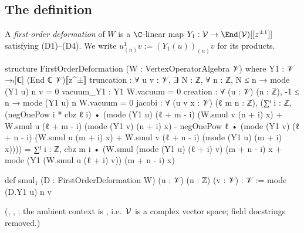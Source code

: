 \subsection{The definition}

\begin{definition}\label{l07:def:fod}
A \emph{first-order deformation} of $W$ is a $\C$-linear map
$Y_1 : \lsevenV\to\End(\lsevenV)[[z^{\pm1}]]$ satisfying (D1)--(D4). We write
$u^1_{(n)}v := (Y_1(u))_{(n)}v$ for its products.
\end{definition}

\begin{leancode}
structure FirstOrderDeformation (W : VertexOperatorAlgebra 𝒱) where
  Y1 : 𝒱 →ₗ[ℂ] (End ℂ 𝒱)⟦z^±⟧
  truncation : ∀ u v : 𝒱, ∃ N : ℤ, ∀ n : ℤ, N ≤ n → mode (Y1 u) n v = 0
  vacuum_Y1 : Y1 W.vacuum = 0
  creation : ∀ (u : 𝒱) (n : ℤ), -1 ≤ n → mode (Y1 u) n W.vacuum = 0
  jacobi : ∀ (u v x : 𝒱) (ℓ m n : ℤ),
      (∑ᶠ i : ℤ, (negOnePow i * cbz ℓ i) •
          (mode (Y1 u) (ℓ + m - i) (W.smul v (n + i) x)
            + W.smul u (ℓ + m - i) (mode (Y1 v) (n + i) x)
            - negOnePow ℓ •
              (mode (Y1 v) (ℓ + n - i) (W.smul u (m + i) x)
                + W.smul v (ℓ + n - i) (mode (Y1 u) (m + i) x))))
        = ∑ᶠ i : ℤ, cbz m i •
            (W.smul (mode (Y1 u) (ℓ + i) v) (m + n - i) x
              + mode (Y1 (W.smul u (ℓ + i) v)) (m + n - i) x)

def smul₁ (D : FirstOrderDeformation W) (u : 𝒱) (n : ℤ) (v : 𝒱) : 𝒱 := mode (D.Y1 u) n v
\end{leancode}
(, ,
; the ambient context is
, i.e.\ $\mathcal{V}$ is a complex vector space;
field docstrings removed.)

